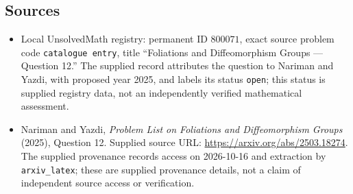 \documentclass[11pt]{article}
\begin{document}
\subsection{Sources}
\begin{itemize}
\item Local UnsolvedMath registry: permanent ID \(800071\), exact source problem code \texttt{catalogue entry}, title ``Foliations and Diffeomorphism Groups --- Question 12.'' The supplied record attributes the question to Nariman and Yazdi, with proposed year 2025, and labels its status \texttt{open}; this status is supplied registry data, not an independently verified mathematical assessment.
\item Nariman and Yazdi, \emph{Problem List on Foliations and Diffeomorphism Groups} (2025), Question 12. Supplied source URL: \url{https://arxiv.org/abs/2503.18274}. The supplied provenance records access on 2026-10-16 and extraction by \texttt{arxiv\_latex}; these are supplied provenance details, not a claim of independent source access or verification.
\end{itemize}
\end{document}
